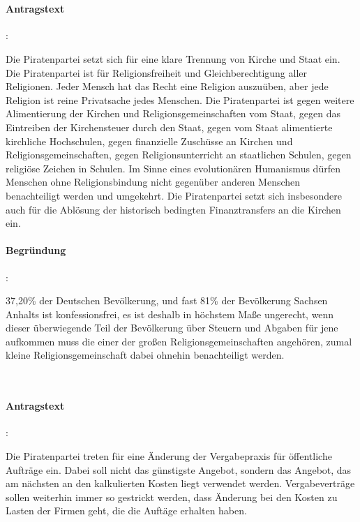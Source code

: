 
\\

\paragraph{Antragstext}:

Die Piratenpartei setzt sich für eine klare Trennung von Kirche und Staat ein. Die Piratenpartei ist für Religionsfreiheit und Gleichberechtigung aller Religionen. Jeder Mensch hat das Recht eine Religion auszuüben, aber jede Religion ist reine Privatsache jedes Menschen. Die Piratenpartei ist gegen weitere Alimentierung der Kirchen und Religionsgemeinschaften vom Staat, gegen das Eintreiben der Kirchensteuer durch den Staat, gegen vom Staat alimentierte kirchliche Hochschulen, gegen finanzielle Zuschüsse an Kirchen und Religionsgemeinschaften, gegen Religionsunterricht an staatlichen Schulen, gegen religiöse Zeichen in Schulen. Im Sinne eines evolutionären Humanismus dürfen Menschen ohne Religionsbindung nicht gegenüber anderen Menschen benachteiligt werden und umgekehrt. Die Piratenpartei setzt sich insbesondere auch für die Ablösung der historisch bedingten Finanztransfers an die Kirchen ein.

\paragraph{Begründung}:

37,20\% der Deutschen Bevölkerung, und fast 81\% der Bevölkerung Sachsen Anhalts ist konfessionsfrei, es ist deshalb in höchstem Maße ungerecht, wenn dieser überwiegende Teil der Bevölkerung über Steuern und Abgaben für jene aufkommen muss die einer der großen Religionsgemeinschaften angehören, zumal kleine Religionsgemeinschaft dabei ohnehin benachteiligt werden.


\\

\paragraph{Antragstext}:

Die Piratenpartei treten für eine Änderung der Vergabepraxis für öffentliche Aufträge ein. Dabei soll nicht das günstigste Angebot, sondern das Angebot, das am nächsten an den kalkulierten Kosten liegt verwendet werden. Vergabeverträge sollen weiterhin immer so gestrickt werden, dass Änderung bei den Kosten zu Lasten der Firmen geht, die die Auftäge erhalten haben.

